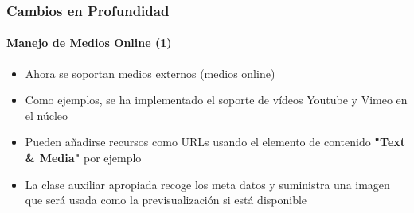\begin{frame}[fragile]
	\frametitle{Cambios en Profundidad}
	\framesubtitle{Manejo de Medios Online (1)}

	\begin{itemize}

		\item Ahora se soportan medios externos (medios online)

		\item Como ejemplos, se ha implementado el soporte de vídeos Youtube y Vimeo en el núcleo

		\item Pueden añadirse recursos como URLs usando el elemento de contenido \textbf{"Text \& Media"}
			por ejemplo

		\item La clase auxiliar apropiada recoge los meta datos y suministra una imagen que será
			usada como la previsualización si está disponible

	\end{itemize}

\end{frame}


